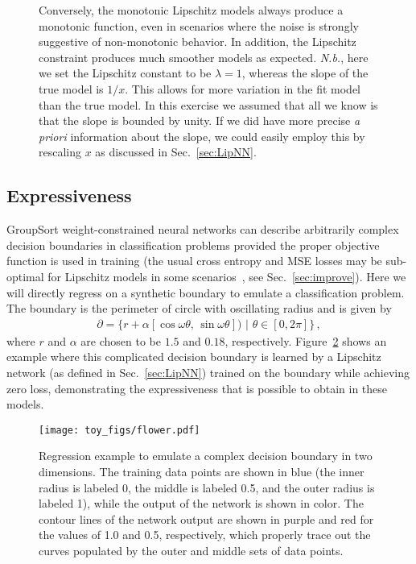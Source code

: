 \documentclass{article}
\begin{document}
\begin{figure}[t!]
{    Conversely, the monotonic Lipschitz models always produce a monotonic function, even in scenarios where the noise is strongly suggestive of non-monotonic behavior. 
    In addition, the Lipschitz constraint produces much smoother models as expected. {\em N.b.}, here we set the Lipschitz constant to be $\lambda = 1$, whereas the slope of the true model is $1/x$. This allows for more variation in the fit model than the true model. In this exercise we assumed that all we know is that the slope is bounded by unity. If we did have more precise {\em a priori} information about the slope, we could easily employ this by rescaling $x$ as discussed in Sec.~\ref{sec:LipNN}. 
        }
    \label{fig:monotonic}
\end{figure}



\subsection{Expressiveness} 

GroupSort weight-constrained neural networks can describe arbitrarily complex decision boundaries in classification problems provided the proper objective function is used in training (the usual cross entropy and MSE losses may be sub-optimal for Lipschitz models in some scenarios~\cite{manyfaces}, see Sec.~\ref{sec:improve}). 
Here we will directly regress on a synthetic boundary to emulate a classification problem. The boundary is the perimeter of circle with oscillating radius and is given by
\begin{align}
\partial = \{r + \alpha[\cos\omega\theta,\, \sin\omega\theta]) \,\, |\,\, \theta\in[0, 2\pi]\} \,,
\end{align}
where $r$ and $\alpha$ are chosen to be $1.5$ and $0.18$, respectively.
Figure~\ref{fig:expressive} shows an example where this complicated decision boundary is learned by a Lipschitz network (as defined in Sec.~\ref{sec:LipNN}) trained on the boundary while achieving zero loss, demonstrating the expressiveness that is possible to obtain in these models. 

\begin{figure}[h!]
    \centering
    \texttt{[image: toy\_figs/flower.pdf]}
    \caption{
    Regression example to emulate a complex decision boundary in two dimensions. 
    The training data points are shown in blue (the inner radius is labeled 0, the middle is labeled 0.5, and the outer radius is labeled 1), while the output of the network is shown in color. The contour lines of the network output are shown in purple and red for the values of 1.0 and 0.5, respectively, which properly trace out the curves populated by the outer and middle sets of data points. 
    \label{fig:expressive} 
    }
\end{figure}
\end{document}
